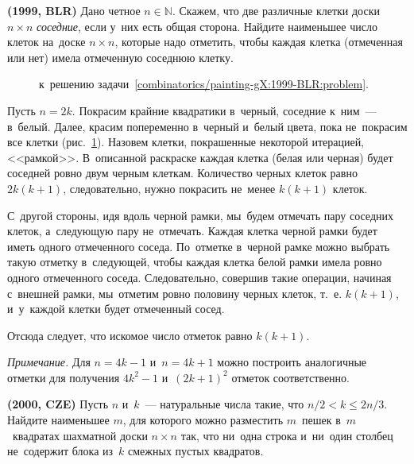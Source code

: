 \begin{problems}

\item\textbf{(1999, BLR)}
\label{combinatorics/painting-gX:1999-BLR:problem}
Дано четное $n \in \mathbb{N}$.
Скажем, что две различные клетки доски $n \times n$ \emph{соседние}, если у~них
есть общая сторона.
Найдите наименьшее число клеток на~доске $n \times n$, которые надо отметить,
чтобы каждая клетка (отмеченная или нет) имела отмеченную соседнюю клетку.

\end{problems}

\ifincludesolutions
\begin{figure}[ht]\begin{center}
\caption{к~решению задачи~\ref{combinatorics/painting-gX:1999-BLR:problem}.}%
\label{combinatorics/painting-gX:1999-BLR:solution:fig}%
\end{center}\end{figure}
Пусть $n = 2 k$.
Покрасим крайние квадратики в~черный, соседние к~ним~--- в~белый.
Далее, красим попеременно в~черный и~белый цвета, пока не~покрасим все клетки 
(рис.~\ref{combinatorics/painting-gX:1999-BLR:solution:fig}).
Назовем клетки, покрашенные некоторой итерацией, <<рамкой>>.
В~описанной раскраске каждая клетка (белая или черная) будет соседней ровно
двум черным клеткам.
Количество черных клеток равно $2 k (k + 1)$, следовательно, нужно покрасить
не~менее $k (k + 1)$ клеток.
\par
С~другой стороны, идя вдоль черной рамки, мы~будем отмечать пару соседних
клеток, а~следующую пару не~отмечать.
Каждая клетка черной рамки будет иметь одного отмеченного соседа.
По~отметке в~черной рамке можно выбрать такую отметку в~следующей, чтобы каждая
клетка белой рамки имела ровно одного отмеченного соседа.
Следовательно, совершив такие операции, начиная с~внешней рамки, мы~отметим
ровно половину черных клеток, т.~е. $k (k + 1)$, и~у~каждой клетки будет
отмеченный сосед.
\par
Отсюда следует, что искомое число отметок равно $k (k + 1)$.
\par
\emph{Примечание.}
Для $n = 4 k - 1$ и~$n = 4 k + 1$ можно построить аналогичные отметки для
получения $4 k^2 - 1$ и~$(2 k + 1)^2$ отметок соответственно.
\fi %

\begin{problems}

\item\textbf{(2000, CZE)}%
\label{combinatorics/painting-gX:2000-CZE:problem}
Пусть $n$ и~$k$~--- натуральные числа такие, что $n / 2 < k \leq 2 n / 3$.
Найдите наименьшее $m$, для которого можно разместить $m$~пешек в~$m$~квадратах
шахматной доски $n \times n$ так, что ни~одна строка и~ни~один столбец
не~содержит блока из~$k$ смежных пустых квадратов.

\end{problems}

